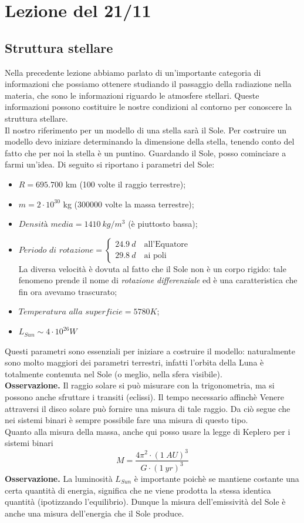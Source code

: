 \documentclass[a4paper,11pt]{article}
\begin{document}
\newpage


\section{Lezione del 21/11}
\subsection{Struttura stellare}
Nella precedente lezione abbiamo parlato di un'importante categoria di informazioni che possiamo ottenere studiando il passaggio della radiazione nella materia, che sono le informazioni riguardo le atmosfere stellari. Queste informazioni possono costituire le nostre condizioni al contorno per conoscere la struttura stellare.\\
Il nostro riferimento per un modello di una stella sarà il Sole. Per costruire un modello devo iniziare determinando la dimensione della stella, tenendo conto del fatto che per noi la stella è un puntino. Guardando il Sole, posso cominciare a farmi un'idea. Di seguito si riportano i parametri del Sole:
\begin{itemize}
    \item $R=695.700$ km (100 volte il raggio terrestre);
    \item $m=2\cdot 10^{30}$ kg (300000 volte la massa terrestre);
    \item $\textit{Densità media}=1410\ kg/m^3$ (è piuttosto bassa);
    \item $\textit{Periodo di rotazione}=\begin{cases}
    24.9\ d\quad \text{all'Equatore}\\
    29.8\ d\quad \text{ai poli}\end{cases}$\\
    La diversa velocità è dovuta al fatto che il Sole non è un corpo rigido: tale fenomeno prende il nome di \textit{rotazione differenziale} ed è una caratteristica che fin ora avevamo trascurato;
    \item $\textit{Temperatura alla superficie}=5780 K$;
    \item $L_{Sun}\sim 4\cdot 10^{26} W$
\end{itemize}
Questi parametri sono essenziali per iniziare a costruire il modello: naturalmente sono molto maggiori dei parametri terrestri, infatti l'orbita della Luna è totalmente contenuta nel Sole (o meglio, nella sfera visibile).\bigskip\\
\textbf{Osservazione.} Il raggio solare si può misurare con la trigonometria, ma si possono anche sfruttare i transiti (eclissi). Il tempo necessario affinchè Venere attraversi il disco solare può fornire una misura di tale raggio. Da ciò segue che nei sistemi binari è sempre possibile fare una misura di questo tipo.\\
Quanto alla misura della massa, anche qui posso usare la legge di Keplero per i sistemi binari
$$M=\frac{4\pi^2\cdot (1\ AU)^3}{G\cdot (1\ yr)^3}$$
\textbf{\textit{}Osservazione.} La luminosità $L_{Sun}$ è importante poichè se mantiene costante una certa quantità di energia, significa che ne viene prodotta la stessa identica quantità (ipotizzando l'equilibrio). Dunque la misura dell'emissività del Sole è anche una misura dell'energia che il Sole produce.
\end{document}
